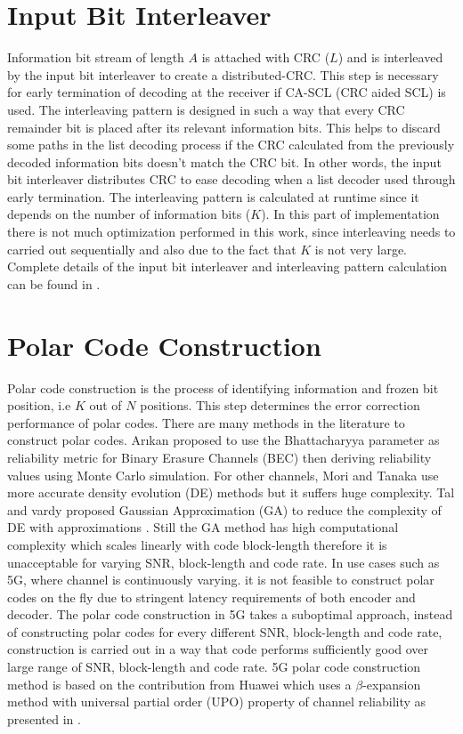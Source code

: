 \section{Input Bit Interleaver}
Information bit stream of length $A$ is attached with CRC ($L$) and is interleaved by the input bit interleaver to create a distributed-CRC. This step is necessary for early termination of decoding at the receiver if CA-SCL (CRC aided SCL) is used. The interleaving pattern is designed in such a way that every CRC remainder bit is placed after its relevant information bits. This helps to discard some paths in the list decoding process if the CRC calculated from the previously decoded information bits doesn't match the CRC bit. In other words, the input bit interleaver distributes CRC to ease decoding when a list decoder used through early termination. The interleaving pattern is calculated at runtime since it depends on the number of information bits ($K$). In this part of implementation there is not much optimization performed in this work, since interleaving needs to carried out sequentially and also due to the fact that $K$ is not very large. Complete details of the input bit interleaver and interleaving pattern calculation can be found in \cite{3gpp.38.212}.

\section{Polar Code Construction}
Polar code construction is the process of identifying information and frozen bit position, i.e $K$ out of $N$ positions. This step determines the error correction performance of polar codes. There are many methods in the literature to construct polar codes. Ar\i kan \cite{Arikan} proposed to use the Bhattacharyya parameter as reliability metric for Binary Erasure Channels (BEC) then deriving reliability values using Monte Carlo simulation. For other channels, Mori and Tanaka \cite{MoriTanakaDE} use more accurate density evolution (DE) methods but it suffers huge complexity. Tal and vardy proposed Gaussian Approximation (GA) to reduce the complexity of DE with approximations \cite{TalVardyGA}. Still the GA method has high computational complexity which scales linearly with code block-length therefore it is unacceptable for varying SNR, block-length and code rate. In use cases such as 5G, where channel is continuously varying. it is not feasible to construct polar codes on the fly due to stringent latency requirements of both encoder and decoder. The polar code construction in 5G takes a suboptimal approach, instead of constructing polar codes for every different SNR, block-length and code rate, construction is carried out in a way that code performs sufficiently good over large range of SNR, block-length and code rate. 5G polar code construction method is based on the contribution from Huawei which uses a $\beta$-expansion method with universal partial order (UPO) property of channel reliability as presented in \cite{betaExpansion}. \newline

